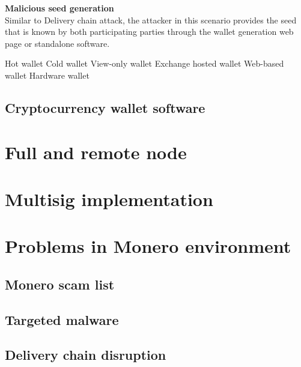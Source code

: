 \documentclass[
  printed, %
  table,   %
  nolof,     %
  nolot,     %
           oneside, color
]{fithesis3}
\begin{document}
\textbf{Malicious seed generation}\\
Similar to Delivery chain attack, the attacker in this scenario provides the seed that is known by both participating parties through the wallet generation web page or standalone software.


\newpage
Hot wallet
Cold wallet
View-only wallet
Exchange hosted wallet
Web-based wallet
Hardware wallet
\subsection{Cryptocurrency wallet software}





\section{Full and remote node}

\section{Multisig implementation}


\section{Problems in Monero environment}

\subsection{Monero scam list}

\subsection{Targeted malware}

\subsection{Delivery chain disruption}
\end{document}
